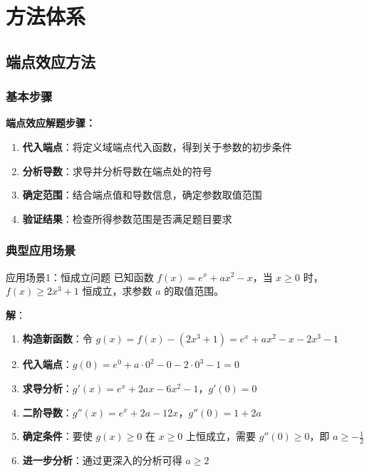 \documentclass[a4paper,12pt]{ctexrep}
\begin{document}
\chapter{方法体系}

\section{端点效应方法}

\subsection{基本步骤}

\textbf{端点效应解题步骤：}
\begin{enumerate}
    \item \textbf{代入端点}：将定义域端点代入函数，得到关于参数的初步条件
    \item \textbf{分析导数}：求导并分析导数在端点处的符号
    \item \textbf{确定范围}：结合端点值和导数信息，确定参数取值范围
    \item \textbf{验证结果}：检查所得参数范围是否满足题目要求
\end{enumerate}

\subsection{典型应用场景}

\begin{examplebox}{应用场景1：恒成立问题}
已知函数 $f(x) = e^x + ax^2 - x$，当 $x \geq 0$ 时，$f(x) \geq 2x^3 + 1$ 恒成立，求参数 $a$ 的取值范围。

\textbf{解}：
\begin{enumerate}
    \item \textbf{构造新函数}：令 $g(x) = f(x) - (2x^3 + 1) = e^x + ax^2 - x - 2x^3 - 1$
    \item \textbf{代入端点}：$g(0) = e^0 + a \cdot 0^2 - 0 - 2 \cdot 0^3 - 1 = 0$
    \item \textbf{求导分析}：$g'(x) = e^x + 2ax - 6x^2 - 1$，$g'(0) = 0$
    \item \textbf{二阶导数}：$g''(x) = e^x + 2a - 12x$，$g''(0) = 1 + 2a$
    \item \textbf{确定条件}：要使 $g(x) \geq 0$ 在 $x \geq 0$ 上恒成立，需要 $g''(0) \geq 0$，即 $a \geq -\frac{1}{2}$
    \item \textbf{进一步分析}：通过更深入的分析可得 $a \geq 2$
\end{enumerate}
\end{examplebox}
\end{document}
